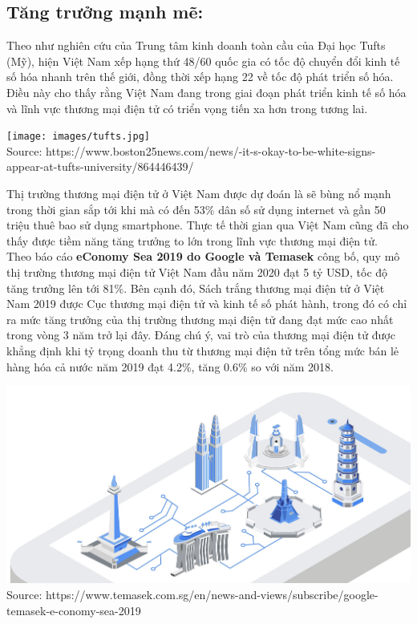 \documentclass[13pt,a4paper]{article}
\begin{document}
\subsection{Tăng trưởng mạnh mẽ:}
Theo như nghiên cứu của Trung tâm kinh doanh toàn cầu của Đại học Tufts (Mỹ), hiện Việt Nam xếp hạng thứ 48/60 quốc gia có tốc độ chuyển đổi kinh tế số hóa nhanh trên thế giới, đồng thời xếp hạng 22 về tốc độ phát triển số hóa. Điều này cho thấy rằng Việt Nam đang trong giai đoạn phát triển kinh tế số hóa và lĩnh vực thương mại điện tử có triển vọng tiến xa hơn trong tương lai.
\begin{center}
\texttt{[image: images/tufts.jpg]}\\
\fontsize{10pt}{1.2pt}\selectfont
    Source: https://www.boston25news.com/news/-it-s-okay-to-be-white-signs-appear-at-tufts-university/864446439/
\end{center}
Thị trường thương mại điện tử ở Việt Nam được dự đoán là sẽ bùng nổ mạnh trong thời gian sắp tới khi mà có đến 53\% dân số sử dụng internet và gần 50 triệu thuê bao sử dụng smartphone. Thực tế thời gian qua Việt Nam cũng đã cho thấy được tiềm năng tăng trưởng to lớn trong lĩnh vực thương mại điện tử.\\
Theo báo cáo \textbf{eConomy Sea 2019 do Google và Temasek} công bố, quy mô thị trường thương mại điện tử Việt Nam đầu năm 2020 đạt 5 tỷ USD, tốc độ tăng trưởng lên tới 81\%. Bên cạnh đó, Sách trắng thương mại điện tử ở Việt Nam 2019 được Cục thương mại điện tử và kinh tế số phát hành, trong đó có chỉ ra mức tăng trưởng của thị trường thương mại điện tử đang đạt mức cao nhất trong vòng 3 năm trở lại đây. Đáng chú ý, vai trò của thương mại điện tử được khẳng định khi tỷ trọng doanh thu từ thương mại điện tử trên tổng mức bán lẻ hàng hóa cả nước năm 2019 đạt 4.2\%, tăng 0.6\% so với năm 2018.\\
\begin{center}
\includegraphics[scale=0.25]{images/economy.jpg}\\
\fontsize{10pt}{1.2pt}\selectfont
    Source: https://www.temasek.com.sg/en/news-and-views/subscribe/google-temasek-e-conomy-sea-2019
\end{center}
\end{document}
